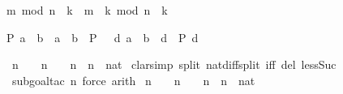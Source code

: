 \begin{isabellebody}
\begin{isamarkuptext}
\begin{isabelle}%
m\ mod\ n\ {\isacharasterisk}\ k\ {\isacharequal}\ m\ {\isacharasterisk}\ k\ mod\ {\isacharparenleft}n\ {\isacharasterisk}\ k{\isacharparenright}%
\end{isabelle}

\begin{isabelle}%
P\ {\isacharparenleft}a\ {\isacharminus}\ b{\isacharparenright}\ {\isacharequal}\ {\isacharparenleft}{\isacharparenleft}a\ {\isacharless}\ b\ {\isasymlongrightarrow}\ P\ {}{\isacharparenright}\ {\isasymand}\ {\isacharparenleft}{\isasymforall}d{\isachardot}\ a\ {\isacharequal}\ b\ {\isacharplus}\ d\ {\isasymlongrightarrow}\ P\ d{\isacharparenright}{\isacharparenright}%
\end{isabelle}
%
\end{isamarkuptext}%
\isamarkuptrue%
\ {\isachardoublequote}{\isacharparenleft}n\ {\isacharminus}\ {}{\isacharparenright}\ {\isacharasterisk}\ {\isacharparenleft}n\ {\isacharplus}\ {}{\isacharparenright}\ {\isacharequal}\ n\ {\isacharasterisk}\ n\ {\isacharminus}\ {\isacharparenleft}{}{\isacharcolon}{\isacharcolon}nat{\isacharparenright}{\isachardoublequote}\isanewline
\isamarkupfalse%
\ {\isacharparenleft}clarsimp\ split{\isacharcolon}\ nat{\isacharunderscore}diff{\isacharunderscore}split\ iff\ del{\isacharcolon}\ less{\isacharunderscore}Suc{}{\isacharparenright}\isanewline
\ %
\isanewline
\isamarkupfalse%
\ {\isacharparenleft}subgoal{\isacharunderscore}tac\ {\isachardoublequote}n{\isacharequal}{}{\isachardoublequote}{\isacharcomma}\ force{\isacharcomma}\ arith{\isacharparenright}\isanewline
\isamarkupfalse%
\isanewline
\isanewline
\isanewline
\isamarkupfalse%
\ {\isachardoublequote}{\isacharparenleft}n\ {\isacharminus}\ {}{\isacharparenright}\ {\isacharasterisk}\ {\isacharparenleft}n\ {\isacharplus}\ {}{\isacharparenright}\ {\isacharequal}\ n\ {\isacharasterisk}\ n\ {\isacharminus}\ {\isacharparenleft}{}{\isacharcolon}{\isacharcolon}nat{\isacharparenright}{\isachardoublequote}\isanewline

\end{isabellebody}
